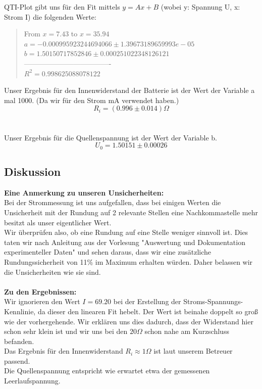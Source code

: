 \documentclass{article}
\begin{document}
QTI-Plot gibt uns für den Fit mittels $y=Ax+B$ (wobei y: Spannung U, x: Strom I) die folgenden Werte: 
\begin{quote}
From $x = 7.43$ to $x = 35.94$\\
$a  = -0.000995923244694066 \pm 1.39673189659993e-05$\\
$b  = 1.50150717852846 \pm 0.000251022348126121$\\
-------------------------------------\\
$R^2 = 0.998625088078122$\\
\end{quote}


\newpage
Unser Ergebnis für den Innenwiderstand der Batterie ist der Wert der Variable a mal 1000. (Da wir für den Strom mA verwendet haben.)\\
$$\boxed{R_i=(0.996 \pm 0.014)\Omega}$$\\
\\
Unser Ergebnis für die Quellenspannung ist der Wert der Variable b. \\
$$\boxed{U_0=1.50151 \pm 0.00026}$$


\subsection{Diskussion}
\textbf{Eine Anmerkung zu unseren Unsicherheiten:}\\
Bei der Strommessung ist uns aufgefallen, dass bei einigen Werten die Unsicherheit mit der Rundung auf 2 relevante Stellen eine Nachkommastelle mehr besitzt als unser eigentlicher Wert.\\
Wir überprüfen also, ob eine Rundung auf eine Stelle weniger sinnvoll ist. Dies taten wir nach Anleitung aus der Vorlesung "Auswertung und Dokumentation experimenteller Daten" und sehen daraus, dass wir eine zusätzliche Rundungssicherheit von 11\% im Maximum erhalten würden. Daher belassen wir die Unsicherheiten wie sie sind.\\
\\
\textbf{Zu den Ergebnissen:}\\
Wir ignorieren den Wert $I=69.20$ bei der Erstellung der Stroms-Spannungs-Kennlinie, da dieser den linearen Fit hebelt. Der Wert ist beinahe doppelt so groß wie der vorhergehende. Wir erklären uns dies dadurch, dass der Widerstand hier schon sehr klein ist und wir uns bei den $20\Omega$ schon nahe am Kurzschluss befanden.
\\
Das Ergebnis für den Innenwiderstand $R_i\approx 1\Omega$ ist laut unserem Betreuer passend.\\
Die Quellenspannung entspricht wie erwartet etwa der gemessenen Leerlaufspannung.
\end{document}
